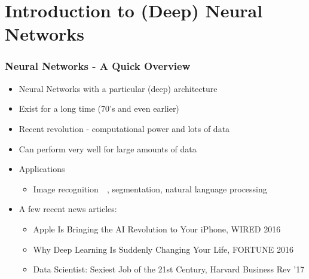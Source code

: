 \documentclass[12pt,fleqn]{beamer}
\begin{document}


\section{Introduction to (Deep) Neural Networks} %
\label{sec:introduction_to_deep_neural_networks}
\begin{frame}\frametitle{{Neural Networks - A Quick Overview}}

\begin{itemize}
	\item Neural Networks with a particular (deep) architecture
    \item Exist for a long time (70's and even earlier)~\cite{Rosenblatt1958,Rumelhart1986,LeCun1990}
    \item Recent revolution - computational power and lots of data~\cite{bengio2009learning,RainaEtAl2009,lecun2015deep}
    \item Can perform very well for large amounts of data
    \item Applications
    \begin{itemize}
    \item Image recognition~~\cite{hinton2012deep,KrizhevskySutskeverHinton2012,lecun2015deep}, segmentation, natural language processing~\cite{BordesEtAl2014,CollobertEtAl2011,  JeanEtAl2014}
    \end{itemize}


    \pause

\item A few recent news articles:

 \begin{itemize}
    \item
{Apple Is Bringing the AI Revolution to Your iPhone, WIRED 2016}
\item
{Why Deep Learning Is Suddenly Changing Your Life,  FORTUNE 2016}
\item Data Scientist: Sexiest Job of the 21st Century, Harvard Business Rev ’17
\end{itemize}

\end{itemize}
\end{frame}
\end{document}
